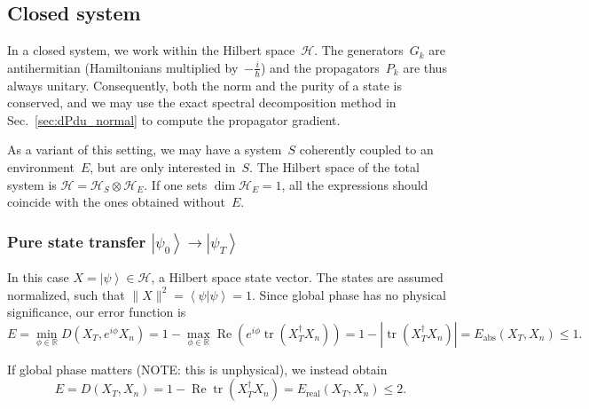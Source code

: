 \documentclass[aps, pra, a4paper, longbibliography, superscriptaddress]{revtex4-1}
\newcommand{\be}{\begin{equation}}
\newcommand{\ee}{\end{equation}}
\newcommand{\R}{{\mathbb R}}  %
\newcommand{\ket}[1]{\left| #1 \right \rangle}
\newcommand{\braket}[2]{\left \langle #1 | #2 \right \rangle}
\newcommand{\ketbra}[2]{\left| #1 \right \rangle \left \langle #2 \right|}
\newcommand{\hilb}[1]{\mathcal{#1}}
\DeclareMathOperator{\tr}{tr}
\DeclareMathOperator{\re}{Re}
\DeclareMathOperator{\cvec}{vec}
\newcommand{\Xt}{X_T}  %
\newcommand{\Xn}{X_n}  %
\begin{document}
\subsection{Closed system}

In a closed system, we work within the Hilbert space~$\hilb{H}$.
The generators~$G_k$ are antihermitian (Hamiltonians multiplied by~$-\frac{i}{\hbar}$)
and the propagators~$P_k$ are thus always
unitary. Consequently, both the norm and the purity of a state is conserved,
and we may use the exact spectral decomposition method in
Sec.~\ref{sec:dPdu_normal} to compute the propagator gradient.

As a variant of this setting,
we may have a system~$S$ coherently coupled to an
environment~$E$, but are only interested in~$S$.
The Hilbert space of the total system is
$\hilb{H} = \hilb{H}_S \otimes \hilb{H}_E$.
If one sets $\dim \hilb{H}_E = 1$, all the expressions should coincide with the ones obtained without~$E$.


\subsubsection{Pure state transfer $\ket{\psi_0} \to \ket{\psi_T}$}
\label{sec:closed-pure}

In this case $X = \ket{\psi} \in \hilb{H}$, a Hilbert space state vector.
The states are assumed normalized, such that $\|X\|^2 = \braket{\psi}{\psi} = 1$.
Since global phase has no physical significance, our error function is
\be
E = \min_{\phi \in \R} D(\Xt, e^{i \phi} \Xn)
= 1 -\max_{\phi \in \R} \re \left( e^{i \phi} \tr(\Xt^\dagger \Xn)\right)
= 1 -|\tr(\Xt^\dagger \Xn)|
= E_\text{abs}(\Xt, \Xn) \le 1.
\ee

\begin{comment}
This result can also be obtained using the mixed state formula in the
vec representation, with $\rho = \ketbra{\psi}{\psi}$ and thus
$X = \cvec(\rho) = \ket{\psi^*} \otimes \ket{\psi}$.
The fidelity diagram breaks into two pieces and
we obtain
\be
f(A, B)
= (\re) \left|(\tr)(A^\dagger  B) \right|^2.
\ee
with $0 \le f(A, B) \le 1$.
Thus the problem simplifies back into Hilbert space
(albeit with an extra absolute value squared in the expression for the fidelity), and we may equivalently
choose $X = \ket{\psi}$.
\end{comment}


If global phase matters (NOTE: this is unphysical), we instead obtain
\be
E
= D(\Xt, \Xn)
= 1 -\re \tr(\Xt^\dagger \Xn)
= E_\text{real}(\Xt, \Xn) \le 2.
\ee
\end{document}

